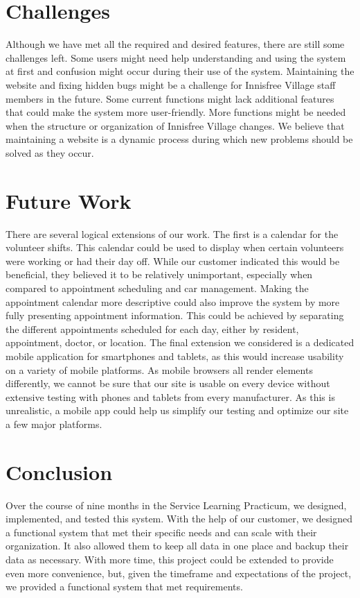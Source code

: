 \documentclass{sig-alternate}
\begin{document}
\section{Challenges}
Although we have met all the required and desired features, there are still some challenges left. Some users might need help understanding and using the system at first and confusion might occur during their use of the system. Maintaining the website and fixing hidden bugs might be a challenge for Innisfree Village staff members in the future. Some current functions might lack additional features that could make the system more user-friendly. More functions might be needed when the structure or organization of Innisfree Village changes. We believe that maintaining a website is a dynamic process during which new problems should be solved as they occur.

\section{Future Work}
There are several logical extensions of our work. The first is a calendar for the volunteer shifts. This calendar could be used to display when certain volunteers were working or had their day off. While our customer indicated this would be beneficial, they believed it to be relatively unimportant, especially when compared to appointment scheduling and car management. Making the appointment calendar more descriptive could also improve the system by more fully presenting appointment information. This could be achieved by separating the different appointments scheduled for each day, either by resident, appointment, doctor, or location. The final extension we considered is a dedicated mobile application for smartphones and tablets, as this would increase usability on a variety of mobile platforms. As mobile browsers all render elements differently, we cannot be sure that our site is usable on every device without extensive testing with phones and tablets from every manufacturer. As this is unrealistic, a mobile app could help us simplify our testing and optimize our site a few major platforms.

\section{Conclusion}
Over the course of nine months in the Service Learning Practicum, we designed, implemented, and tested this system. With the help of our customer, we designed a functional system that met their specific needs and can scale with their organization. It also allowed them to keep all data in one place and backup their data as necessary. With more time, this project could be extended to provide even more convenience, but, given the timeframe and expectations of the project, we provided a functional system that met requirements. 
\end{document}
